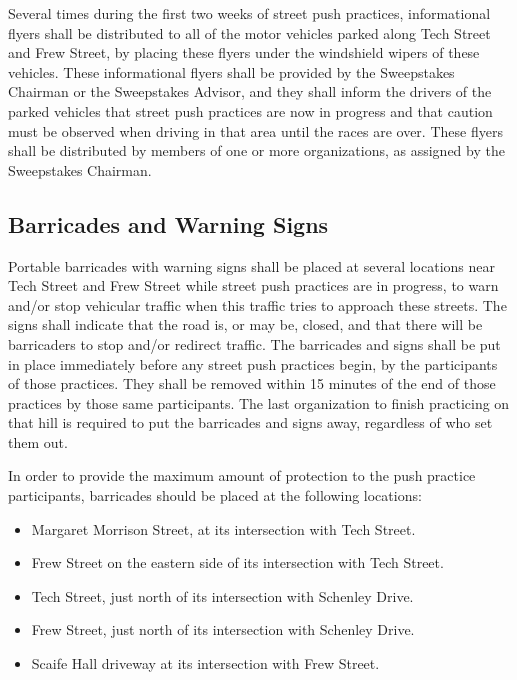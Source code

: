 	Several times during the first two weeks of street push practices, informational flyers shall be distributed to all of the motor vehicles parked along Tech Street and Frew Street, by placing these flyers under the windshield wipers of these vehicles. These informational flyers shall be provided by the Sweepstakes Chairman or the Sweepstakes Advisor, and they shall inform the drivers of the parked vehicles that street push practices are now in progress and that caution must be observed when driving in that area until the races are over. These flyers shall be distributed by members of one or more organizations, as assigned by the Sweepstakes Chairman.

\subsection{Barricades and Warning Signs}
\label{subsec:Freeroll Barricades}

	Portable barricades with warning signs shall be placed at several locations near Tech Street and Frew Street while street push practices are in progress, to warn and/or stop vehicular traffic when this traffic tries to approach these streets. The signs shall indicate that the road is, or may be, closed, and that there will be barricaders to stop and/or redirect traffic. The barricades and signs shall be put in place immediately before any street push practices begin, by the participants of those practices. They shall be removed within 15 minutes of the end of those practices by those same participants. The last organization to finish practicing on that hill is required to put the barricades and signs away, regardless of who set them out.

	In order to provide the maximum amount of protection to the push practice participants, barricades should be placed at the following locations:

	\begin{itemize}

		\item Margaret Morrison Street, at its intersection with Tech Street.

		\item Frew Street on the eastern side of its intersection with Tech Street.

		\item Tech Street, just north of its intersection with Schenley Drive.

		\item Frew Street, just north of its intersection with Schenley Drive.

		\item Scaife Hall driveway at its intersection with Frew Street.

	\end{itemize}


